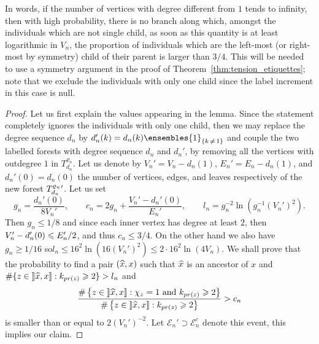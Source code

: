 \documentclass[AHL,Unicode,longabstracts,published]{cedram}
\newcommand{\rrbracket}{\mathclose{]\mkern -2.7mu]}}
\newcommand{\1}{\ensembles{1}}
\newcommand{\ind}[1]{\1_{\{#1\}}}
\renewcommand{\le}{\leqslant}
\renewcommand{\ge}{\geqslant}
\newcommand{\clE}{\mathcal{E}}
\newcommand{\fn}{T_{d_n}^{\varrho_n}}
\newcommand{\edges}{E}
\newcommand{\vertices}{V}
\let\oldhat\hat
\renewcommand*{\hat}[1]{\mathchoice{\widehat{#1}}{\widehat{#1}}{\oldhat{#1}}{\oldhat{#1}}}
\begin{document}
In words, if the number of vertices with degree different from $1$ tends to infinity, then with high probability, there is no branch along which, amongst the individuals which are not single child, as soon as this quantity is at least logarithmic in $\vertices_{n}$, the proportion of individuals which are the left-most (or right-most by symmetry) child of their parent is larger than $3/4$. This will be needed to use a symmetry argument in the proof of Theorem~\ref{thm:tension_etiquettes}; note that we exclude the individuals with only one child since the label increment in this case is null.


\begin{proof}
Let us first explain the values appearing in the lemma. Since the statement completely ignores the individuals with only one child, then we may replace the degree sequence $d_n$ by $d_n'(k) = d_n(k) \ind{k\,\ne\,1}$ and couple the two labelled forests with degree sequence $d_n$ and $d_n'$, by removing all the vertices with outdegree $1$ in $\fn$. Let us denote by $\vertices_{n}' = \vertices_{n}-d_{n}(1)$, $\edges_{n}' = \edges_{n}-d_{n}(1)$, and $d_{n}'(0) = d_{n}(0)$ the number of vertices, edges, and leaves respectively of the new forest ${\fn}\vphantom{T}'$. Let us set
\[
g_n = \frac{d_{n}'(0)}{8 \vertices_{n}'},
\qquad c_n = 2g_n + \frac{\vertices_n'-d_{n}'(0)}{\edges_n'},
\qquad l_n = g_n^{-2} \ln\left(g_n^{-1} \left(\vertices_n'\right)^2\right).
\]
Then $g_{n} \le 1/8$ and since each inner vertex has degree at least $2$, then $\vertices_n'-d_{n}'(0)\linebreak\le \edges_n'/2$, and thus $c_{n} \le 3/4$. On the other hand we also have $g_{n} \ge 1/16$ so\linebreak$l_{n} \le 16^{2} \ln(16 (\vertices_n')^2) \le 2\cdot16^{2} \ln(4 \vertices_{n})$. We shall prove that the probability to find a pair $(\hat{x}, x)$ such that $\hat{x}$ is an ancestor of $x$ and $\#\{z \in \mathopen{\rrbracket} \hat{x}, x\rrbracket : k_{pr(z)} \ge 2\} > l_{n}$ and
\[
\frac{\#\left\{z \in \mathopen{\rrbracket} \hat{x}, x\rrbracket : \chi_z = 1 \text{ and } k_{pr(z)} \ge 2\right\}}{\#\left\{z \in \mathopen{\rrbracket} \hat{x}, x\rrbracket : k_{pr(z)} \ge 2\right\}} > c_{n}
\]
is smaller than or equal to $2 (\vertices_n')^{- 2}$. Let $\clE_{n}' \supset \clE_{n}^{c}$ denote this event, this implies our claim.



\end{proof}
\end{document}
